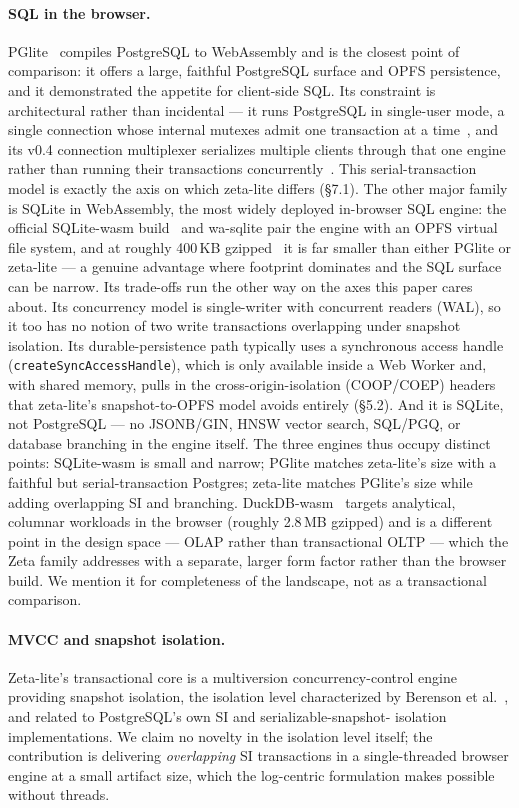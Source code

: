 \documentclass[11pt]{article}
\begin{document}
\paragraph{SQL in the browser.}
PGlite~\cite{pglite} compiles PostgreSQL to WebAssembly and is the closest point of
comparison: it offers a large, faithful PostgreSQL surface and OPFS persistence,
and it demonstrated the appetite for client-side SQL. Its constraint is
architectural rather than incidental --- it runs PostgreSQL in single-user mode, a
single connection whose internal mutexes admit one transaction at a
time~\cite{pgliteapi}, and its v0.4 connection multiplexer serializes multiple
clients through that one engine rather than running their transactions
concurrently~\cite{pglitev04}. This serial-transaction model is exactly the axis on
which zeta-lite differs (\S7.1). The other major family is SQLite in WebAssembly,
the most widely deployed in-browser SQL engine: the official SQLite-wasm
build~\cite{sqlitewasm} and wa-sqlite pair the engine with an OPFS virtual file
system, and at roughly 400\,KB gzipped~\cite{kanopy} it is far smaller than either
PGlite or zeta-lite --- a genuine advantage where footprint dominates and the SQL
surface can be narrow. Its trade-offs run the other way on the axes this paper
cares about. Its concurrency model is single-writer with concurrent readers (WAL),
so it too has no notion of two write transactions overlapping under snapshot
isolation. Its durable-persistence path typically uses a synchronous access handle
(\texttt{createSyncAccessHandle}), which is only available inside a Web Worker and,
with shared memory, pulls in the cross-origin-isolation (COOP/COEP) headers that
zeta-lite's snapshot-to-OPFS model avoids entirely (\S5.2). And it is SQLite, not
PostgreSQL --- no JSONB/GIN, HNSW vector search, SQL/PGQ, or database branching in
the engine itself. The three engines thus occupy distinct points: SQLite-wasm is
small and narrow; PGlite matches zeta-lite's size with a faithful but
serial-transaction Postgres; zeta-lite matches PGlite's size while adding
overlapping SI and branching. DuckDB-wasm~\cite{kanopy} targets analytical,
columnar workloads in the browser (roughly 2.8\,MB gzipped) and is a different
point in the design space --- OLAP rather than transactional OLTP --- which the
Zeta family addresses with a separate, larger form factor rather than the browser
build. We mention it for completeness of the landscape, not as a transactional
comparison.

\paragraph{MVCC and snapshot isolation.}
Zeta-lite's transactional core is a multiversion concurrency-control engine
providing snapshot isolation, the isolation level characterized by Berenson et
al.~\cite{berenson}, and related to PostgreSQL's own SI and serializable-snapshot-
isolation implementations. We claim no novelty in the isolation level itself; the
contribution is delivering \emph{overlapping} SI transactions in a single-threaded
browser engine at a small artifact size, which the log-centric formulation makes
possible without threads.
\end{document}
